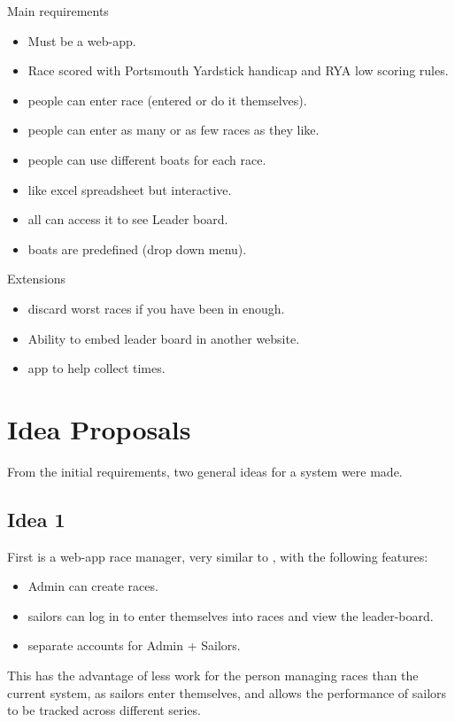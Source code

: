 \documentclass{l4proj}
\begin{document}
Main requirements
\begin{itemize}
    \item
    Must be a web-app.
    \item
    Race scored with Portsmouth Yardstick handicap and RYA low scoring rules.
    \item
    people can enter race (entered or do it themselves).
    \item
    people can enter as many or as few races as they like.
    \item
    people can use different boats for each race.
    \item
    like excel spreadsheet but interactive.
    \item
    all can access it to see Leader board.
    \item
    boats are predefined (drop down menu).
\end{itemize}
Extensions
\begin{itemize}
    \item
    discard worst races if you have been in enough.
    \item
    Ability to embed leader board in another website.
    \item
    app to help collect times.
\end{itemize}

\section{Idea Proposals}
From the initial requirements, two general ideas for a system were made.
\subsection{Idea 1}
First is a web-app race manager, very similar to \citet{SailEvent}, with the following features:
\begin{itemize}
    \item
    Admin can create races.
    \item
    sailors can log in to enter themselves into races and view the leader-board.
    \item
    separate accounts for Admin + Sailors.
\end{itemize}

This has the advantage of less work for the person managing races than the current system, as sailors enter themselves, and allows the performance of sailors to be tracked across different series.
\end{document}

